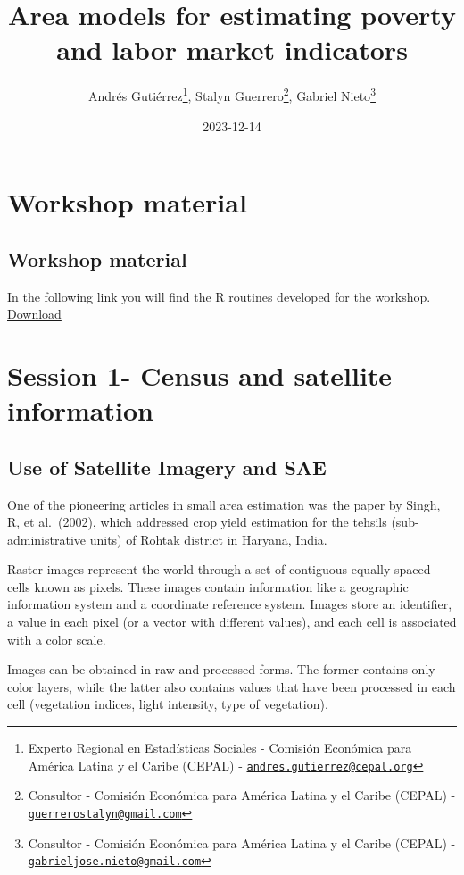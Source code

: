 \documentclass[
  12pt,
]{book}
\title{Area models for estimating poverty and labor market indicators}
\author{Andrés Gutiérrez\footnote{Experto Regional en Estadísticas Sociales - Comisión Económica para América Latina y el Caribe (CEPAL) - \href{mailto:andres.gutierrez@cepal.org}{\nolinkurl{andres.gutierrez@cepal.org}}}, Stalyn Guerrero\footnote{Consultor - Comisión Económica para América Latina y el Caribe (CEPAL) - \href{mailto:guerrerostalyn@gmail.com}{\nolinkurl{guerrerostalyn@gmail.com}}}, Gabriel Nieto\footnote{Consultor - Comisión Económica para América Latina y el Caribe (CEPAL) - \href{mailto:gabrieljose.nieto@gmail.com}{\nolinkurl{gabrieljose.nieto@gmail.com}}}}
\date{2023-12-14}
\begin{document}
\maketitle

{
\hypersetup{linkcolor=}
\setcounter{tocdepth}{1}
\tableofcontents
}
\listoffigures
\listoftables
\hypertarget{workshop-material}{%
\chapter*{Workshop material}\label{workshop-material}}

\hypertarget{workshop-material-1}{%
\section*{Workshop material}\label{workshop-material-1}}

In the following link you will find the R routines developed for the workshop.
\href{https://github.com/stalynGuerrero/2023JAMSae/}{Download}

\hypertarget{session-1--census-and-satellite-information}{%
\chapter{Session 1- Census and satellite information}\label{session-1--census-and-satellite-information}}

\hypertarget{use-of-satellite-imagery-and-sae}{%
\section{Use of Satellite Imagery and SAE}\label{use-of-satellite-imagery-and-sae}}

One of the pioneering articles in small area estimation was the paper by Singh, R, et al.~(2002), which addressed crop yield estimation for the tehsils (sub-administrative units) of Rohtak district in Haryana, India.

Raster images represent the world through a set of contiguous equally spaced cells known as pixels. These images contain information like a geographic information system and a coordinate reference system. Images store an identifier, a value in each pixel (or a vector with different values), and each cell is associated with a color scale.

Images can be obtained in raw and processed forms. The former contains only color layers, while the latter also contains values that have been processed in each cell (vegetation indices, light intensity, type of vegetation).
\end{document}
